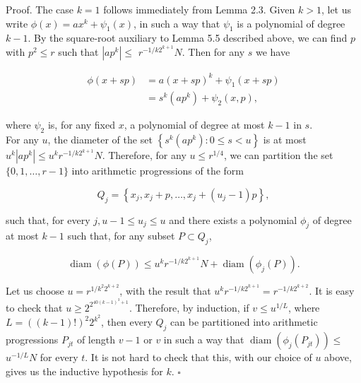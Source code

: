 \documentclass[10pt]{article}
\begin{document}
Proof. The case $k=1$ follows immediately from Lemma 2.3. Given $k>1$, let us write $\phi(x)=a x^{k}+\psi_{1}(x)$, in such a way that $\psi_{1}$ is a polynomial of degree $k-1$. By the square-root auxiliary to Lemma 5.5 described above, we can find $p$ with $p^{2}\leqslant r$ such that $\left|a p^{k}\right| \leqslant$ $r^{-1 / k 2^{k+1}} N$. Then for any $s$ we have

$$
\begin{aligned}
\phi(x+s p) & =a(x+s p)^{k}+\psi_{1}(x+s p) \\
& =s^{k}\left(a p^{k}\right)+\psi_{2}(x, p),
\end{aligned}
$$

where $\psi_{2}$ is, for any fixed $x$, a polynomial of degree at most $k-1$ in $s$.\\
For any $u$, the diameter of the set $\left\{s^{k}\left(a p^{k}\right): 0 \leqslant s<u\right\}$ is at most $u^{k}\left|a p^{k}\right| \leqslant u^{k} r^{-1 / k 2^{k+1}} N$. Therefore, for any $u \leqslant r^{1 / 4}$, we can partition the set $\{0,1, \ldots, r-1\}$ into arithmetic progressions of the form

$$
Q_{j}=\left\{x_{j}, x_{j}+p, \ldots, x_{j}+\left(u_{j}-1\right) p\right\},
$$

such that, for every $j, u-1 \leqslant u_{j} \leqslant u$ and there exists a polynomial $\phi_{j}$ of degree at most $k-1$ such that, for any subset $P \subset Q_{j}$,

$$
\operatorname{diam}(\phi(P)) \leqslant u^{k} r^{-1 / k 2^{k+1}} N+\operatorname{diam}\left(\phi_{j}(P)\right) .
$$

Let us choose $u=r^{1 / k^{2} 2^{k+2}}$, with the result that $u^{k} r^{-1 / k 2^{k+1}}=r^{-1 / k 2^{k+2}}$. It is easy to check that $u \geqslant 2^{2^{40(k-1)^{3}+1}}$. Therefore, by induction, if $v \leqslant u^{1 / L}$, where $L=((k-1)!)^{2} 2^{k^{2}}$, then every $Q_{j}$ can be partitioned into arithmetic progressions $P_{j t}$ of length $v-1$ or $v$ in such a way that $\operatorname{diam}\left(\phi_{j}\left(P_{j t}\right)\right) \leqslant$ $u^{-1 / L} N$ for every $t$. It is not hard to check that this, with our choice of $u$ above, gives us the inductive hypothesis for $k$. \(\square\)
\end{document}
